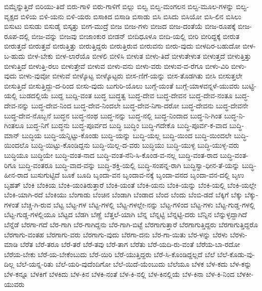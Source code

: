 {ಬಿಮ್ಮೆನ್ನುತ್ತಿದೆ
ಬಿರಿಯು-ತಿದೆ
ಬಿರು-ಗಾಳಿ
ಬಿರು-ಗಾಳಿಗೆ
ಬಿಲ್ಲು
ಬಿಲ್ವ
ಬಿಲ್ವ-ಮಂಗಲನ
ಬಿಲ್ವ-ಮೂಲ-ಗಳನ್ನು
ಬಿಲ್ವ-ವೃಕ್ಷದ
ಬಿಳಿಯ
ಬಿಳಿ-ಯನು
ಬಿಳಿ-ಯರು
ಬಿಸಾಕಿದ
ಬಿಸಾಡಿ
ಬಿಸಾಡು
ಬಿಸಿ
ಬಿಸಿದು
ಬಿಸಿಯೋ
ಬಿಸಿ-ಲಿನ
ಬಿಸಿಲು
ಬಿಸುಟು
ಬಿಸುಡು
ಬಿಸುಡೈ
ಬಿಸ್ಕತ್ತು
ಬೀಗ-ಮುದ್ರೆ
ಬೀಜ
ಬೀಜ-ಗಳು
ಬೀಜದ
ಬೀಜ-ದಂತೆಯೆ
ಬೀಜ-ರೂಪಕ್ಕೆ
ಬೀಜ-ರೂಪ-ದಲ್ಲಿ
ಬೀಜ-ವನ್ನು
ಬೀಜವು
ಬೀಜಾಂಕುರ
ಬೀಡನ್
ಬೀದಿಧೂಳೂ
ಬೀದಿ-ಯಲ್ಲಿ
ಬೀರಿ
ಬೀರಿದ್ದಕ್ಕೆ
ಬೀರುತ
ಬೀರುತ್ತದೆ
ಬೀರುತ್ತವೆ
ಬೀರುತ್ತಿತ್ತು
ಬೀರುತ್ತಿದ್ದರು
ಬೀರುತ್ತಿರುವ
ಬೀರುವನು
ಬೀರು-ವುದು
ಬೀಳದಿರ-ಬಹುದೋ
ಬೀಳ-ಬ-ಹುದು
ಬೀಳ-ಬೇಕು
ಬೀಳ-ಲಾರೆಯೊ
ಬೀಳಲಿ
ಬೀಳಿಸಿ
ಬೀಳುತ
ಬೀಳು-ತಿದೆ
ಬೀಳುತೇಳುತ
ಬೀಳುತ್ತದೆ
ಬೀಳುತ್ತಿತ್ತು
ಬೀಳುತ್ತಿದೆ
ಬೀಳುತ್ತಿ-ರಲು
ಬೀಳುತ್ತೇವೆ
ಬೀಳುವ
ಬೀಳು-ವನು
ಬೀಳು-ವರು
ಬೀಳುವ-ವ-ರೆಗೂ
ಬೀಳು-ವಿರಿ
ಬೀಳು-ವುದು
ಬೀಳು-ವುವೋ
ಬೀಳುವೆ
ಬೀಳ್ಕೊಟ್ಟ
ಬೀಳ್ಕೊಟ್ಟರು
ಬೀಸ-ಣಿಗೆ-ಯನ್ನು
ಬೀಸ-ತೊಡಗಿತು
ಬೀಸಿ
ಬೀಸುತ್ತಲೇ
ಬೀಸುತ್ತಿದೆ
ಬೀಸುತ್ತಿದ್ದು-ದ-ರಿಂದ
ಬೀಸು-ವುದು
ಬುಗುರಿ-ಯೊಲು
ಬುಗ್ಗೆ-ಯಂತೆ
ಬುಗ್ಗೆ-ಯಾಳವನ್ನಳೆ-ಯುವರು
ಬುಟ್ಟಿ-ಯಲ್ಲಿ
ಬುಡದಲ್ಲಿಯೆ
ಬುದ್ದ
ಬುದ್ದಿ-ವಂತ
ಬುದ್ಧ
ಬುದ್ಧತ್ವ
ಬುದ್ಧ-ದೇವ
ಬುದ್ಧ-ದೇವನ
ಬುದ್ಧ-ದೇವ-ನಂತೂ
ಬುದ್ಧ-ದೇವ-ನನ್ನು
ಬುದ್ಧ-ದೇವ-ನಿಂದ
ಬುದ್ಧ-ದೇವ-ನಿಂದಲೇ
ಬುದ್ಧ-ದೇವ-ನಿಗಾ-ದರೋ
ಬುದ್ಧ-ದೇವನು
ಬುದ್ಧ-ದೇವನೇ
ಬುದ್ಧ-ದೇವ-ನೊಬ್ಬನೆ
ಬುದ್ಧನ
ಬುದ್ಧ-ನಂಥ
ಬುದ್ಧ-ನನ್ನು
ಬುದ್ಧ-ನಲ್ಲಿ
ಬುದ್ಧ-ನಿಂದಾದ
ಬುದ್ಧ-ನಿ-ಗಿಂತ
ಬುದ್ಧ-ನಿ-ಗಿಂತಲೂ
ಬುದ್ಧ-ನಿಗೆ
ಬುದ್ಧನು
ಬುದ್ಧ-ಪೂರ್ವದ
ಬುದ್ಧಿ
ಬುದ್ಧಿಂ
ಬುದ್ಧಿ-ಗದೇಕೊ
ಬುದ್ಧಿ-ಪೂರ್ವ-ಕ-ವಾದ
ಬುದ್ಧಿ-ಮಾನ್
ಬುದ್ಧಿಯ
ಬುದ್ಧಿ-ಯನ್ನಿಟ್ಟು-ಕೊಂಡು
ಬುದ್ಧಿ-ಯನ್ನು
ಬುದ್ಧಿ-ಯಲ್ಲ
ಬುದ್ಧಿ-ಯಿಂದ
ಬುದ್ಧಿ-ಯಿಂದಲೇ
ಬುದ್ಧಿ-ಯಿಂದಲೊ
ಬುದ್ಧಿ-ಯಿಟ್ಟು-ಕೊಂಡಿದ್ದನು
ಬುದ್ಧಿ-ಯಿಲ್ಲ-ದ-ವರು
ಬುದ್ಧಿಯು
ಬುದ್ಧಿ-ಯುಳ್ಳ
ಬುದ್ಧಿ-ಯುಳ್ಳ-ವರು
ಬುದ್ಧಿಯೂ
ಬುದ್ಧಿಯೇ
ಬುದ್ಧಿ-ವಂತ-ನಾದ
ಬುದ್ಧಿ-ವಂತ-ನೆನಿ-ಸಿ-ಕೊಂಡ-ವ-ನಲ್ಲ
ಬುದ್ಧಿ-ವಂತ-ರಾದ
ಬುದ್ಧಿ-ವಂತ-ರಿಗೂ
ಬುದ್ಧಿ-ವಂತರೂ
ಬುದ್ಧಿ-ವಾದ-ವನ್ನು
ಬುದ್ಧಿ-ಶಕ್ತಿ-ಯಲ್ಲಿ
ಬುದ್ಧಿ-ಸಂಪನ್ನ-ರಾಗಿ
ಬುದ್ಧಿಸ್ವಾ-ಧೀನ-ತೆ-ಯನ್ನು
ಬುದ್ಧಿ-ಹೀನ-ರಾದ
ಬುಸುಗುಟ್ಟಿದೆ
ಬೂಕೆ
ಬೂದಿ
ಬೃಂದಾ-ವನ
ಬೃಂದಾವ-ನಕ್ಕೆ
ಬೃಂದಾ-ವನದ
ಬೃಂದಾ-ವನ-ದಲ್ಲಿ
ಬೃಉ
ಬೃಹತ್
ಬೆಂಕಿ
ಬೆಂಕಿಯ
ಬೆಂಕಿ-ಯಂತಿರುತ್ತಾರೆ
ಬೆಂಕಿ-ಯಂತೆ
ಬೆಂಕಿ-ಯನು
ಬೆಂಕಿ-ಯನ್ನು
ಬೆಂಕಿ-ಯಲ್ಲಿ
ಬೆಂಕಿ-ಯಲ್ಲೇ
ಬೆಂಕಿ-ಯಾಗಿ-ರದೆ
ಬೆಂಕಿಯು
ಬೆಂಗಾಡು
ಬೆಂಚಿನ
ಬೆಂಡಾಗಿ
ಬೆಂಡಾದ
ಬೆಂದ
ಬೆಂದು
ಬೆಂಬಿ-ಡದೆ
ಬೆಕ್ಕಿಗೆ
ಬೆಕ್ಕು
ಬೆಕ್ಕು-ಗಳಂತೆ
ಬೆಚ್ಚ-ಗಿ-ರುವ
ಬೆಟ್ಟ
ಬೆಟ್ಟ-ಗಳ
ಬೆಟ್ಟ-ಗಳಲ್ಲಿ
ಬೆಟ್ಟ-ಗಳಲ್ಲೇ-ನನ್ನು
ಬೆಟ್ಟ-ಗಳಿಂದ
ಬೆಟ್ಟ-ಗಳು
ಬೆಟ್ಟ-ಗುಡ್ಡ-ಗಳಲ್ಲಿ
ಬೆಟ್ಟ-ಗುಡ್ಡ-ಗಳಲ್ಲಿಯೂ
ಬೆಟ್ಟದ
ಬೆಡಗಿ
ಬೆಣ್ಣೆ
ಬೆತ್ತಲೆ-ಯಾಗಿ
ಬೆನ್ನ
ಬೆನ್ನಟ್ಟಿ
ಬೆನ್ನಟ್ಟಿ-ದರು
ಬೆನ್ನಿನ
ಬೆನ್ನುಳ್ಳದ್ದಾಗಿದೆ
ಬೆನ್ನೆಡೆ
ಬೆರಗಾ-ಗದೆ
ಬೆರ-ಗಾಗಿ
ಬೆರ-ಗಾಗಿದ್ದನು
ಬೆರ-ಗಾಗಿ-ಬಿಟ್ಟೆ
ಬೆರಗಾಗುತ್ತಾರೆ
ಬೆರಗಾಗುತ್ತಿದ್ದರು
ಬೆರಗಾಗುತ್ತಿದ್ದರೊ
ಬೆರಗಾಗು-ವಂತಹ
ಬೆರಗಾಗು-ವರು
ಬೆರಗಾಗು-ವುದು
ಬೆರಗಾ-ದನು
ಬೆರ-ಗಾ-ಯಿತು
ಬೆರ-ಳನ್ನು
ಬೆರಳು
ಬೆರಳು-ಮಾಡಿ
ಬೆರೆತ
ಬೆರೆ-ತರೂ
ಬೆರೆ-ತರೆ
ಬೆರೆ-ತವು
ಬೆರೆ-ತಾಗ
ಬೆರೆತು
ಬೆರೆ-ಯದಿ-ರು-ವಂತೆ
ಬೆರೆಯ-ಬಾ-ರದೋ
ಬೆರೆಯ-ಬೇಕು
ಬೆರೆ-ಯ-ಬೇಕೆಂಬುದು
ಬೆರೆ-ಯಿರಿ
ಬೆರೆ-ಯುತ್ತಿದ್ದರು
ಬೆರೆ-ಸಿ-ಕೊಂಡಿದ್ದಲ್ಲದೆ
ಬೆಲೆ
ಬೆಲೆ-ಕೊಡು-ವು-ದಿಲ್ಲ
ಬೆಲೆ-ಯನ್ನ-ರಿತು
ಬೆಲೆ-ಯರಿ-ವುದೆಂದಿಗೋ
ಬೆಲೆ-ಯಿದೆ-ಯೆಂಬುದು
ಬೆಲೆಯೂ
ಬೆಳಕ
ಬೆಳ-ಕದು
ಬೆಳ-ಕನ್ನು
ಬೆಳ-ಕನ್ನೂ
ಬೆಳಕಿಗೆ
ಬೆಳಕಿದು
ಬೆಳ-ಕಿನ
ಬೆಳಕಿ-ನಂತೆ
ಬೆಳ-ಕಿ-ನಲ್ಲಿ
ಬೆಳ-ಕಿನಲ್ಲಿಯೆ
ಬೆಳ-ಕಿನಾ
ಬೆಳ-ಕಿ-ನಿಂದ
ಬೆಳಕೀ-ಯುವರು
}
